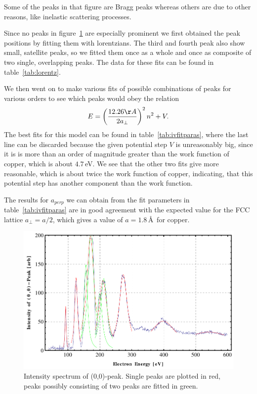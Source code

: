 \documentclass[a4paper,10pt]{scrartcl}
\begin{document}
Some of the peaks in that figure are Bragg peaks whereas others are due to other reasons, like inelastic scattering processes.

Since no peaks in figure~\ref{fig:iv} are especially prominent we first obtained the peak positions by fitting them with lorentzians. The third and fourth peak also show small, satellite peaks, so we fitted them once as a whole and once as composite of two single, overlapping peaks. The data for these fits can be found in table~\ref{tab:lorentz}. 

We then went on to make various fits of possible combinations of peaks for various orders to see which peaks would obey the relation
\begin{equation}
E = \left( \frac{12.26\AA}{2a_{\perp}} \right)^{2} n^{2} + V.
\end{equation}
The best fits for this model can be found in table~\ref{tab:ivfitparas}, where the last line can be discarded because the given potential step $V$ is unreasonably big, since it is is more than an order of magnitude greater than the work function of copper, which is about $4.7\,$eV. We see that the other two fits give more reasonable, which is about twice the work function of copper, indicating, that this potential step has another component than the work function. 

The results for $a_{perp}$ we can obtain from the fit parameters in table~\ref{tab:ivfitparas} are  in good agreement with the expected value for the FCC lattice $a_{\perp} = a/2$, which gives a value of $a=1.8\,$\AA~for copper.

\begin{figure}
\centering
\includegraphics[scale=0.55]{img/iv}
\caption{Intensity spectrum of (0,0)-peak. Single peaks are plotted in red, peaks possibly consisting of two peaks are fitted in green.\label{fig:iv}}
\end{figure}
\end{document}
